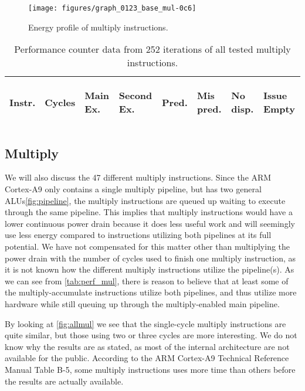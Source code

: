 \begin{figure*}
    \centering
    \texttt{[image: figures/graph\_0123\_base\_mul-0c6]}
    \caption{Energy profile of multiply instructions.}
    \label{fig:allmul}
\end{figure*}

\begin{table}
    \centering
    \begin{tabular}{|p{0.7cm}|R{0.8cm}R{0.6cm}R{0.85cm}R{0.6cm}R{0.45cm}R{0.75cm}R{0.72cm}|}
        \hline
        \centering
        Instr. &
        \centering
        Cycles &
        \centering
        Main Ex. &
        \centering
        Second Ex. &
        \centering
        Pred.&
        \centering
        Mis pred.&
        \centering
        No disp. &
        \begin{centering}
        Issue Empty
        \end{centering}
        \\
        \hline
        
        \hline
    \end{tabular}
    \caption{Performance counter data from 252 iterations of all tested multiply
    instructions.}
    \label{tab:perf_mul}
\end{table}


\subsection{Multiply}
We will also discuss the 47 different multiply instructions. Since the ARM
Cortex-A9 only contains a single multiply pipeline, but has two general
ALUs\autoref{fig:pipeline}, the multiply instructions are queued up waiting to
execute through the same pipeline. This implies that multiply instructions would
have a lower continuous power drain because it does less useful work and will
seemingly use less energy compared to instructions utilizing both pipelines at
its full potential. We have not compensated for this matter other than
multiplying the power drain with the number of cycles used to finish one
multiply instruction, as it is not known how the different multiply instructions
utilize the pipeline(s). As we can see from \autoref{tab:perf_mul}, there is
reason to believe that at least some of the multiply-accumulate instructions
utilize both pipelines\cite{ramangcc}, and thus utilize more hardware while
still queuing up through the multiply-enabled main
pipeline.

By looking at \autoref{fig:allmul} we see that the single-cycle multiply
instructions are quite similar, but those using two or three cycles are more
interesting. We do not know why the results are as stated, as most of the
internal architecture are not available for the public. According to the ARM
Cortex-A9 Technical Reference Manual Table B-5, some multiply instructions uses
more time than others before the results are actually available\cite{armtech}.

